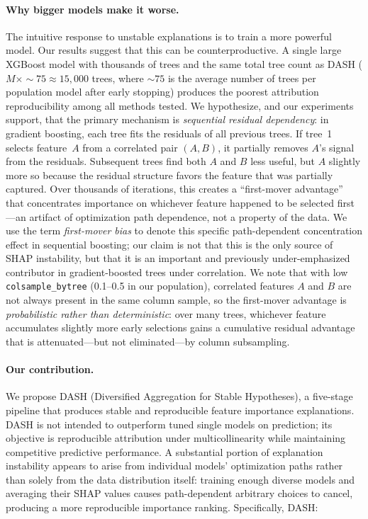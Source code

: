 \documentclass[10pt]{article}
\newcommand{\dash}{\textsc{DASH}}
\begin{document}
\paragraph{Why bigger models make it worse.}
The intuitive response to unstable explanations is to train a more powerful
model. Our results suggest that this can be counterproductive. A single large
XGBoost model with thousands of trees and the same total tree count as \dash{} ($M \times {\sim}75 \approx 15{,}000$ trees, where ${\sim}75$ is the average number of trees per population model after early stopping) produces the poorest attribution reproducibility among all methods
tested. We hypothesize, and our experiments support, that
the primary mechanism is \emph{sequential residual dependency}: in gradient boosting,
each tree fits the residuals of all previous trees. If tree~1 selects
feature~$A$ from a correlated pair $(A, B)$, it partially removes $A$'s
signal from the residuals. Subsequent trees find both $A$ and $B$ less
useful, but $A$ slightly more so because the residual structure favors the
feature that was partially captured. Over thousands of iterations, this
creates a ``first-mover advantage'' that concentrates importance on
whichever feature happened to be selected first---an artifact of
optimization path dependence, not a property of the data.
We use the term \emph{first-mover bias} to denote this specific
path-dependent concentration effect in sequential boosting;
our claim is not that this is the only source of SHAP instability,
but that it is an important and previously under-emphasized contributor
in gradient-boosted trees under correlation.
We note that with low \texttt{colsample\_bytree} (0.1--0.5 in our
population), correlated features $A$ and $B$ are not always present
in the same column sample, so the first-mover advantage is
\emph{probabilistic rather than deterministic}: over many trees,
whichever feature accumulates slightly more early selections gains a
cumulative residual advantage that is attenuated---but not eliminated---by
column subsampling.

\paragraph{Our contribution.}
We propose \dash{} (Diversified Aggregation for Stable Hypotheses), a five-stage
pipeline that produces stable and reproducible feature importance
explanations. \dash{} is not intended to outperform tuned single models on
prediction; its objective is reproducible attribution under multicollinearity
while maintaining competitive predictive performance. A substantial portion of explanation instability appears to arise from
individual models' optimization paths rather than solely from the data
distribution itself: training enough diverse models and averaging their
SHAP values causes path-dependent arbitrary choices to cancel,
producing a more reproducible importance ranking. Specifically, \dash{}:
\end{document}
